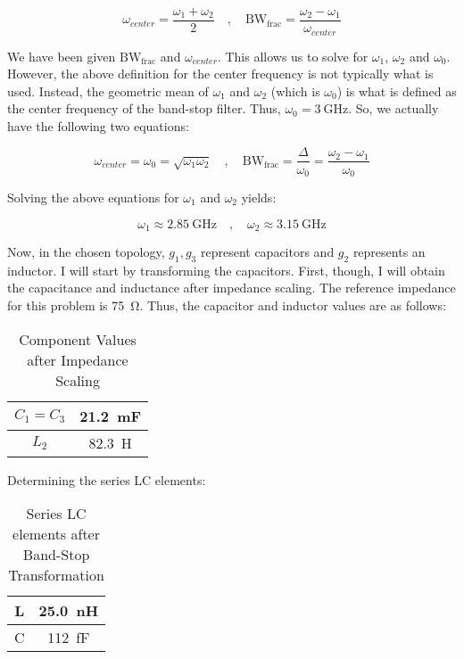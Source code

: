 \[
    \omega_{center} = \frac{\omega_1 + \omega_2}{2} \quad,\quad
    \text{BW}_{\text{frac}} = \frac{\omega_2 - \omega_1}{\omega_{center}}
\]

We have been given $\text{BW}_{\text{frac}}$ and $\omega_{center}$. This allows
us to solve for $\omega_1$, $\omega_2$ and $\omega_0$. However, the above
definition for the center frequency is not typically what is used. Instead, the
geometric mean of $\omega_1$ and $\omega_2$ (which is $\omega_0$) is what is
defined as the center frequency of the band-stop filter. Thus, $\omega_0 =
\SI{3}{\giga\hertz}$. So, we actually have the following two equations:

\[ 
    \omega_{center} = \omega_0 = \sqrt{\omega_1 \omega_2} \quad,\quad
    \text{BW}_{\text{frac}} = \frac{\Delta}{\omega_0} = \frac{\omega_2 -
    \omega_1}{\omega_0}
\]

Solving the above equations for $\omega_1$ and $ \omega_2 $ yields:

\[ 
    \omega_1 \approx \SI{2.85}{\giga\hertz} \quad,\quad \omega_2 \approx
    \SI{3.15}{\giga\hertz} 
\]

Now, in the chosen topology, $g_1, g_3$ represent capacitors and $g_2$
represents an inductor. I will start by transforming the capacitors. First,
though, I will obtain the capacitance and inductance after impedance scaling.
The reference impedance for this problem is \SI{75}{\ohm}. Thus, the capacitor
and inductor values are as follows:

\begin{table}[h]
    \centering
    \caption{Component Values after Impedance Scaling}
    \label{tab:2_comp_values}
    \begin{tabular}{|c|c|}
    \hline $ C_1 = C_3$ & \SI{21.2}{\milli\farad} \\
    \hline $ L_2 $ & \SI{82.3}{\henry} \\
    \hline
    \end{tabular}
\end{table}

Determining the series LC elements:

\begin{table}[h]
    \centering
    \caption{Series LC elements after Band-Stop Transformation}
    \label{tab:2_series_elements}
    \begin{tabular}{|c|c|}
        \hline L & \SI{25.0}{\nano\henry} \\
        \hline C & \SI{112}{\femto\farad} \\
        \hline
    \end{tabular}
\end{table}

